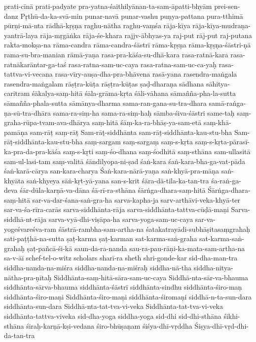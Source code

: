 {prati-cīnā
prati-padyate
pra-yatna-śaithilyānan-ta-sam-āpatti-bhyām
prei-sen-danz
Pṛthū-da-ka-svā-min
punar-navā
punar-vashu
puṇya-pattana
pura-tthimā
pūrṇi-mā-nta
rādhā-kṛṣṇa
raghu-nātha
raghu-vaṃśa
rāja-kīya
rāja-kīya-mudraṇa-yantrā-laya
rāja-mṛgāṅka
rāja-śe-khara
rajjv-ābhyas-ya
raj-put
rāj-put
raj-putana
rakta-mokṣa-na
rāma-candra
rāma-candra-śāstrī
rāma-kṛṣṇa
rāma-kṛṣṇa-śāstri-ṇā
rama-su-bra-manian
rāmā-yaṇa
rasa-pra-kāśa-su-dhā-kara
rasa-ratnā-kara
rasa-ratnākarāntar-ga-taś
rasa-ratna-sam-uc-caya
rasa-ratna-sam-uc-ca-yaḥ
rasa-tattva-vi-vecana
rasa-vīry-auṣa-dha-pra-bhāvena
rasā-yana
rasendra-maṅgala
rasendra-maṅgalam
rāṣṭra-kūṭa
rāṣṭra-kūṭas
ṣaḍ-dharaṇa
sādhana
sāhitya-caritram 
śākalya-saṃ-hitā
śāla-grāma-kṛta
śāli-vāhana
sāmañña-pha-la-sutta
sāmañña-phala-sutta
sāmānya-dharma
sama-ran-gana-su-tra-dhara
samā-raṅga-ṇa-sū-tra-dhāra
sama-ra-siṃ-ha
sama-ra-siṃ-haḥ
sāmba-śiva-śāstri
same-taḥ
saṃ-graha-rūpa-tvam-ava-dhārya
saṃ-hitā
śāṃ-ka-ra-bhāṣ-ya-sam-etā
saṃ-khā-pamāṇa
sam-rāṭ
saṃ-rāṭ
Sam-rāṭ-siddhānta
sam-rāṭ-siddhānta-kau-stu-bha
Sam-rāṭ-siddhānta-kau-stu-bha
saṃ-sargam
saṃ-sargaṃ
saṃ-s-kṛta
saṃ-s-kṛta-pārasī-ka-pra-da-pra-kāśa
saṃ-s-kṛti 
saṃ-śo-dhana
saṃ-śodhitā
saṃ-sthāna
sam-ullasitā
sam-ul-lasi-tam
saṃ-valitā
śāndilyopa-ni-ṣad
śaṅ-kara
śaṅ-kara-bha-ga-vat-pāda
śaṅ-karā-cārya
san-kara-charya
Śaṅ-kara-nārā-yaṇa
saṅ-khyā-pra-māṇa
saṅ-khyāta
saṅ-khyeya
sāṅ-kṛt-yā-yana
san-s-krit
śāra-dā-tila-ka-tan-tra
śa-raṅ-ga-deva
śār-dūla-karṇā-va-dāna
śā-rī-ra-sthāna
śārṅga-dhara-saṃ-hitā
Śārṅga-dhara-saṃ-hitā
sar-va-dar-śana-saṅ-gra-ha
sarva-kapha-ja
sarv-arthāvi-veka-khyā-ter
sar-va-śa-rīra-carās
sarva-siddhānta-rāja
sarva-siddhānta-tattva-cūḍā-maṇi
Sarva-siddhā-nt-rāja
sarva-vyā-dhi-viṣāpa-ha
sarva-yoga-sam-uc-caya
sar-va-yogeśvareśva-ram
śāstrā-rambha-sam-artha-na
śatakatrayādi-subhāṣitasaṃgrahaḥ
sati-paṭṭhā-na-sutta
ṣaṭ-karma
ṣaṭ-karman
sat-karma-saṅ-graha
sat-karma-saṅ-grahaḥ
ṣaṭ-pañcā-śi-kā
saun-da-ra-nanda
sau-ra-pau-rāṇi-ka-mata-sam-artha-na
sa-v-āī
schef-tel-o-witz
scholars
sharī-ra
sheth
shri-gonde-kar
sid-dha-man-tra
siddha-nanda-na-miśra
siddha-nanda-na-miśraḥ
siddha-nā-tha
siddha-nitya-nātha-pra-ṇītaḥ
Siddhānta-saṃ-hitā-sāra-sam-uc-caya
Siddhā-nta-sār-va-bhauma
siddhānta-sārva-bhauma
siddhānta-śāstrī
siddhānta-sindhu
siddhānta-śiro-maṇ
siddhānta-śiro-maṇi
Siddhānta-śiro-maṇi
siddhānta-śiromaṇi
siddhā-n-ta-sun-dara
siddhānta-sun-dara
Siddhā-nta-tat-tva-vi-veka
Siddhānta-tat-tva-vi-veka
siddhānta-tattva-viveka
sid-dha-yoga
siddha-yoga
sid-dhi
sid-dhi-sthāna
śikhi-sthāna
śiraḥ-karṇā-kṣi-vedana
śiro-bhūṣaṇam
śiśya-dhī-vṛddha
Śiṣya-dhī-vṛd-dhi-da-tan-tra
}
